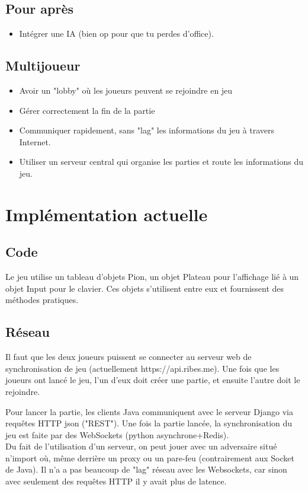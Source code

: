 \documentclass{article}
\begin{document}
\subsection{Pour après}
\begin{itemize}
\item Intégrer une IA (bien op pour que tu perdes d'office).
\end{itemize}
\newpage

\subsection{Multijoueur}
\begin{itemize}
  \item Avoir un "lobby" où les joueurs peuvent se rejoindre en jeu
  \item Gérer correctement la fin de la partie
  \item Communiquer rapidement, sans "lag" les informations du jeu à travers Internet.
  \item Utiliser un serveur central qui organise les parties et route les informations du jeu.
\end{itemize}

\section{Implémentation actuelle}
\subsection{Code}
Le jeu utilise un tableau d'objets Pion, un objet Plateau pour l'affichage lié à un objet Input pour le clavier.
Ces objets s'utilisent entre eux et fournissent des méthodes pratiques.
\subsection{Réseau}
Il faut que les deux joueurs puissent se connecter au serveur web de synchronisation de jeu (actuellement https://api.ribes.me).
Une fois que les joueurs ont lancé le jeu, l'un d'eux doit créer une partie, et ensuite l'autre doit le rejoindre.

Pour lancer la partie, les clients Java communiquent avec le serveur Django via requêtes HTTP json ("REST"). Une fois la partie lancée, la synchronisation du jeu est faite par des WebSockets (python asynchrone+Redis).
\\

Du fait de l'utilisation d'un serveur, on peut jouer avec un adversaire situé n'import où, même derrière un proxy ou un pare-feu (contrairement aux Socket de Java). Il n'a a pas beaucoup de "lag" réseau avec les Websockets, car sinon avec seulement des requêtes HTTP il y avait plus de latence.
\\
\end{document}
